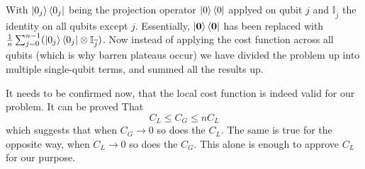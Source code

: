 \documentclass[12pt]{article}
\begin{document}
With $\left\vert{0_j}\right\rangle\left\langle{0_j}\right\vert$ being the projection operator $\left\vert{0}\right\rangle\left\langle{0}\right\vert$ applyed on qubit $j$ and $\mathbb{I}_{\overline j}$ the identity on all qubits except $j$. Essentially, $\left\vert{\bf 0}\right\rangle\left\langle{\bf 0}\right\vert$
has been replaced with $\frac{1}{n}\sum_{j=0}^{n-1}(\left\vert{0_j}\right\rangle\left\langle{0_j}\right\vert\otimes \mathbb{I}_{\overline j})$. Now instead of applying the cost function across all qubits (which is why barren plateaus occur) we have  divided the problem up into multiple single-qubit terms, and summed all the results up.

It needs to be confirmed now, that the local cost function is indeed valid for our problem. It can be proved That
$$C_L \leq C_G \leq nC_L $$ 
which suggests that when $C_G \rightarrow 0 $ so does the $C_L$. The same is true for the opposite way, when $C_L \rightarrow 0 $ so does the $C_G$. This alone is enough to approve $C_L$ for our purpose.
\end{document}

